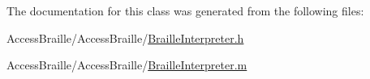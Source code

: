 The documentation for this class was generated from the following files\-:\begin{DoxyCompactItemize}
\item 
Access\-Braille/\-Access\-Braille/\hyperlink{_braille_interpreter_8h}{Braille\-Interpreter.\-h}\item 
Access\-Braille/\-Access\-Braille/\hyperlink{_braille_interpreter_8m}{Braille\-Interpreter.\-m}\end{DoxyCompactItemize}
